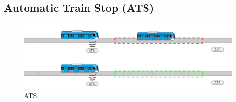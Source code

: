 \subsection{Automatic Train Stop (ATS)}

\lipsum[1]

    \begin{figure}[!h]
        \centering
        \includegraphics[width=1\textwidth]{Figuras/ATS}
        \centering\caption{ATS.}
        \label{fig:ATS_1}
    \end{figure}

\lipsum[1]